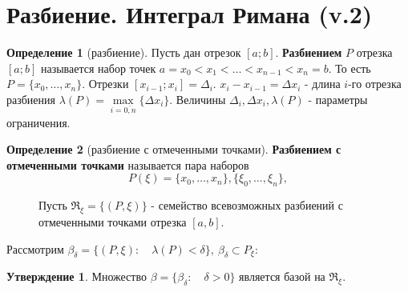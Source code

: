 \documentclass{report}
\theoremstyle{definition}
\newtheorem{definition}{Определение}[section]
\newtheorem{statement}{Утверждение}[section]
\begin{document}
\section{Разбиение. Интеграл Римана (v.2)}

\begin{definition}[разбиение]
  Пусть дан отрезок $[a;b]$. \textbf{Разбиением} $P$ отрезка $[a;b]$ называется набор точек $a=x_{0}<x_{1}<\ldots
    <x_{n-1}<x_{n}=b$. То есть $P = \{x_{0},\ldots,x_{n}\}$. Отрезки $[x_{i-1};x_{i}] = \Delta_{i}$.
  $x_{i}-x_{i-1} = \Delta x_{i}$ - длина $i$-го отрезка разбиения $\lambda(P) = \underset{i=\overline{0,n}}
    {\max}\{\Delta x_{i}\}$. Величины $\Delta_{i}, \Delta x_{i}, \lambda(P)$ - параметры ограничения.
\end{definition}

\begin{definition}[разбиение с отмеченными точками]
  \textbf{Разбиением с отмеченными точками} называется пара наборов
  \begin{equation*}
    P(\xi) = \{x_{0},\ldots,x_{n}\},\{\xi_{0},\ldots,\xi_{n}\},
  \end{equation*}
  \begin{figure}[h]
    \begin{minipage}[h]{0.49\linewidth}
    \end{minipage}
    \hfill
    \begin{minipage}[h]{0.49\linewidth}
      Пусть $\Re_{\xi} = \{(P,\xi)\}$ - семейство всевозможных разбиений с отмеченными точками отрезка $[a,b]$.
    \end{minipage}
  \end{figure}
\end{definition}

Рассмотрим $\beta_{\delta} = \{(P,\xi):\quad \lambda(P) < \delta\}, \ \beta_{\delta}\subset P_{\xi}$:

\begin{statement}
  Множество $\beta = \{\beta_{\delta}:\quad \delta > 0\}$ является базой на $\Re_{\xi}$.
\end{statement}
\end{document}
